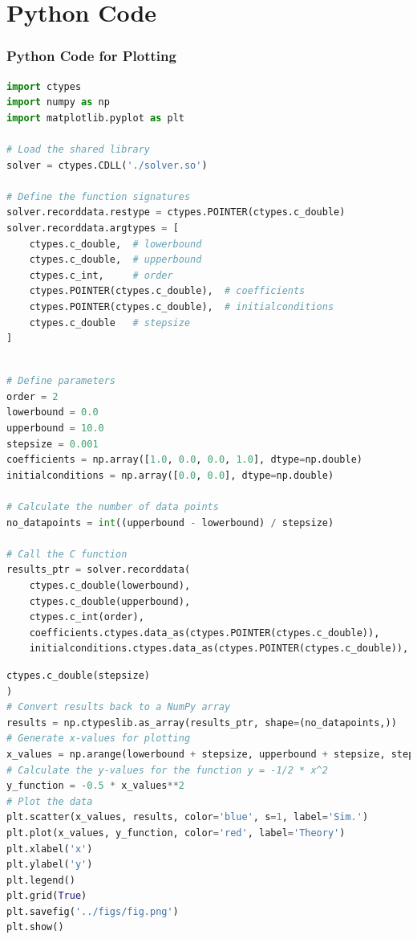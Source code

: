 \documentclass{beamer}
\theoremstyle{remark}
\numberwithin{equation}{section}
\begin{document}
\section{Python Code}
\begin{frame}[fragile]
\frametitle{Python Code for Plotting}
\begin{lstlisting}[language=Python]
import ctypes
import numpy as np
import matplotlib.pyplot as plt

# Load the shared library
solver = ctypes.CDLL('./solver.so')

# Define the function signatures
solver.recorddata.restype = ctypes.POINTER(ctypes.c_double)
solver.recorddata.argtypes = [
    ctypes.c_double,  # lowerbound
    ctypes.c_double,  # upperbound
    ctypes.c_int,     # order
    ctypes.POINTER(ctypes.c_double),  # coefficients
    ctypes.POINTER(ctypes.c_double),  # initialconditions
    ctypes.c_double   # stepsize
]

\end{lstlisting}
\end{frame}
\begin{frame}[fragile]
\begin{lstlisting}[language=Python]

# Define parameters
order = 2
lowerbound = 0.0
upperbound = 10.0
stepsize = 0.001
coefficients = np.array([1.0, 0.0, 0.0, 1.0], dtype=np.double) 
initialconditions = np.array([0.0, 0.0], dtype=np.double)

# Calculate the number of data points
no_datapoints = int((upperbound - lowerbound) / stepsize)

# Call the C function
results_ptr = solver.recorddata(
    ctypes.c_double(lowerbound),
    ctypes.c_double(upperbound),
    ctypes.c_int(order),
    coefficients.ctypes.data_as(ctypes.POINTER(ctypes.c_double)),
    initialconditions.ctypes.data_as(ctypes.POINTER(ctypes.c_double)),

\end{lstlisting}
\end{frame}
\begin{frame}[fragile]
\begin{lstlisting}[language=Python]
    ctypes.c_double(stepsize)
)
# Convert results back to a NumPy array
results = np.ctypeslib.as_array(results_ptr, shape=(no_datapoints,))
# Generate x-values for plotting
x_values = np.arange(lowerbound + stepsize, upperbound + stepsize, stepsize)
# Calculate the y-values for the function y = -1/2 * x^2
y_function = -0.5 * x_values**2
# Plot the data
plt.scatter(x_values, results, color='blue', s=1, label='Sim.')
plt.plot(x_values, y_function, color='red', label='Theory')
plt.xlabel('x')
plt.ylabel('y')
plt.legend()
plt.grid(True)
plt.savefig('../figs/fig.png')
plt.show()
\end{lstlisting}
\end{frame}
\end{document}
